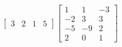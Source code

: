 \documentclass[letterpaper,12pt]{article}
\begin{document}
\[
\begin{bmatrix}
3 & 2 & 1 & 5
\end{bmatrix}
\begin{bmatrix}
1  &  1 & -3 \\
-2 &  3 &  3 \\
-5 & -9 &  2 \\
2  &  0 &  1
\end{bmatrix}
\]
\end{document}
